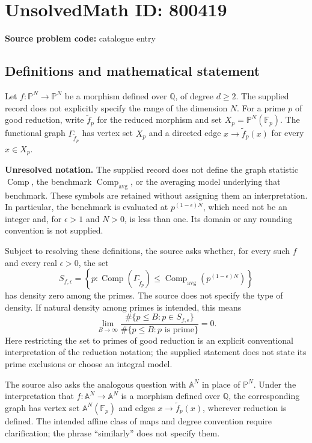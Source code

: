 \documentclass[11pt]{article}
\newcommand{\Q}{\mathbb{Q}}
\newcommand{\F}{\mathbb{F}}
\newcommand{\A}{\mathbb{A}}
\newcommand{\PP}{\mathbb{P}}
\begin{document}
\section*{UnsolvedMath ID: 800419}
\textbf{Source problem code:} catalogue entry
\subsection{Definitions and mathematical statement}
Let \(f:\PP^N\to\PP^N\) be a morphism defined over \(\Q\), of degree \(d\ge 2\). The supplied record does not explicitly specify the range of the dimension \(N\). For a prime \(p\) of good reduction, write \(\widetilde f_p\) for the reduced morphism and set \(X_p=\PP^N(\F_p)\). The functional graph \(\Gamma_{\widetilde f_p}\) has vertex set \(X_p\) and a directed edge \(x\to\widetilde f_p(x)\) for every \(x\in X_p\).

\textbf{Unresolved notation.} The supplied record does not define the graph statistic \(\operatorname{Comp}\), the benchmark \(\operatorname{Comp}_{\mathrm{avg}}\), or the averaging model underlying that benchmark. These symbols are retained without assigning them an interpretation. In particular, the benchmark is evaluated at \(p^{(1-\epsilon)N}\), which need not be an integer and, for \(\epsilon>1\) and \(N>0\), is less than one. Its domain or any rounding convention is not supplied.

Subject to resolving these definitions, the source asks whether, for every such \(f\) and every real \(\epsilon>0\), the set
\[
S_{f,\epsilon}=\left\{p:\operatorname{Comp}(\Gamma_{\widetilde f_p})\leq \operatorname{Comp}_{\mathrm{avg}}\!\left(p^{(1-\epsilon)N}\right)\right\}
\]
has density zero among the primes. The source does not specify the type of density. If natural density among primes is intended, this means
\[
\lim_{B\to\infty}\frac{\#\{p\leq B:p\in S_{f,\epsilon}\}}{\#\{p\leq B:p\text{ is prime}\}}=0.
\]
Here restricting the set to primes of good reduction is an explicit conventional interpretation of the reduction notation; the supplied statement does not state its prime exclusions or choose an integral model.

The source also asks the analogous question with \(\A^N\) in place of \(\PP^N\). Under the interpretation that \(f:\A^N\to\A^N\) is a morphism defined over \(\Q\), the corresponding graph has vertex set \(\A^N(\F_p)\) and edges \(x\to\widetilde f_p(x)\), wherever reduction is defined. The intended affine class of maps and degree convention require clarification; the phrase ``similarly'' does not specify them.
\end{document}
